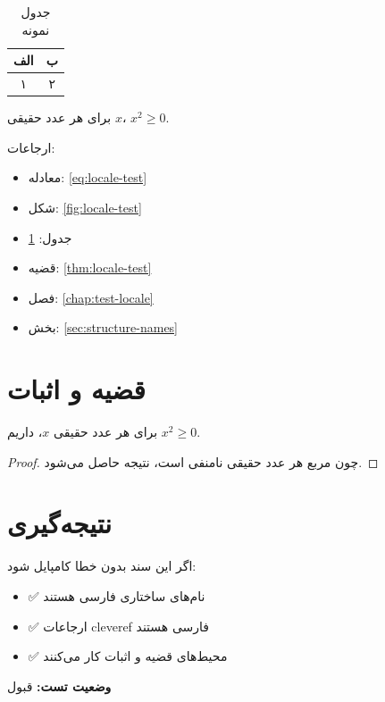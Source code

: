 \documentclass{matinbook}
\begin{document}
\begin{table}[h]
\centering
\caption{جدول نمونه}
\label{tab:locale-test}
\begin{tabular}{cc}
\toprule
الف & ب \\
\midrule
۱ & ۲ \\
\bottomrule
\end{tabular}
\end{table}

\begin{theorem}
    برای هر عدد حقیقی $x$، $x^2 \geq 0$.
\end{theorem}
\label{thm:locale-test}

ارجاعات:

\begin{itemize}
    \item معادله: \cref{eq:locale-test}
    \item شکل: \cref{fig:locale-test}
    \item جدول: \cref{tab:locale-test}
    \item قضیه: \cref{thm:locale-test}
    \item فصل: \cref{chap:test-locale}
    \item بخش: \cref{sec:structure-names}
\end{itemize}

\section{قضیه و اثبات}
\label{sec:theorem-proof}

\begin{theorem}
    برای هر عدد حقیقی $x$، داریم $x^2 \geq 0$.
\end{theorem}

\begin{proof}
    چون مربع هر عدد حقیقی نامنفی است، نتیجه حاصل می‌شود.
\end{proof}

\section{نتیجه‌گیری}
\label{sec:conclusion}

اگر این سند بدون خطا کامپایل شود:

\begin{itemize}
    \item ✅ نام‌های ساختاری فارسی هستند
    \item ✅ ارجاعات cleveref فارسی هستند
    \item ✅ محیط‌های قضیه و اثبات کار می‌کنند
\end{itemize}

\textbf{وضعیت تست:} قبول
\end{document}
